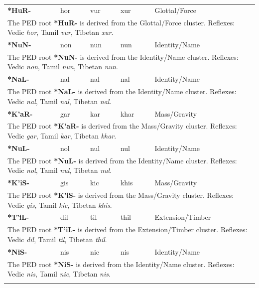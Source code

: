 \begin{longtable}{p{} p{} p{} p{} p{}}
\textbf{*HuR-} & hor & vur & xur & Glottal/Force \\ 
\multicolumn{5}{p{\textwidth}}{\small The PED root \textbf{*HuR-} is derived from the Glottal/Force cluster. Reflexes: Vedic \textit{hor}, Tamil \textit{vur}, Tibetan \textit{xur}. } \\ \addlinespace 
\textbf{*NuN-} & non & nun & nun & Identity/Name \\ 
\multicolumn{5}{p{\textwidth}}{\small The PED root \textbf{*NuN-} is derived from the Identity/Name cluster. Reflexes: Vedic \textit{non}, Tamil \textit{nun}, Tibetan \textit{nun}. } \\ \addlinespace 
\textbf{*NaL-} & nal & nal & nal & Identity/Name \\ 
\multicolumn{5}{p{\textwidth}}{\small The PED root \textbf{*NaL-} is derived from the Identity/Name cluster. Reflexes: Vedic \textit{nal}, Tamil \textit{nal}, Tibetan \textit{nal}. } \\ \addlinespace 
\textbf{*K'aR-} & gar & kar & khar & Mass/Gravity \\ 
\multicolumn{5}{p{\textwidth}}{\small The PED root \textbf{*K'aR-} is derived from the Mass/Gravity cluster. Reflexes: Vedic \textit{gar}, Tamil \textit{kar}, Tibetan \textit{khar}. } \\ \addlinespace 
\textbf{*NuL-} & nol & nul & nul & Identity/Name \\ 
\multicolumn{5}{p{\textwidth}}{\small The PED root \textbf{*NuL-} is derived from the Identity/Name cluster. Reflexes: Vedic \textit{nol}, Tamil \textit{nul}, Tibetan \textit{nul}. } \\ \addlinespace 
\textbf{*K'iS-} & gis & kic & khis & Mass/Gravity \\ 
\multicolumn{5}{p{\textwidth}}{\small The PED root \textbf{*K'iS-} is derived from the Mass/Gravity cluster. Reflexes: Vedic \textit{gis}, Tamil \textit{kic}, Tibetan \textit{khis}. } \\ \addlinespace 
\textbf{*T'iL-} & dil & til & thil & Extension/Timber \\ 
\multicolumn{5}{p{\textwidth}}{\small The PED root \textbf{*T'iL-} is derived from the Extension/Timber cluster. Reflexes: Vedic \textit{dil}, Tamil \textit{til}, Tibetan \textit{thil}. } \\ \addlinespace 
\textbf{*NiS-} & nis & nic & nis & Identity/Name \\ 
\multicolumn{5}{p{\textwidth}}{\small The PED root \textbf{*NiS-} is derived from the Identity/Name cluster. Reflexes: Vedic \textit{nis}, Tamil \textit{nic}, Tibetan \textit{nis}. } \\ \addlinespace 

\end{longtable}

